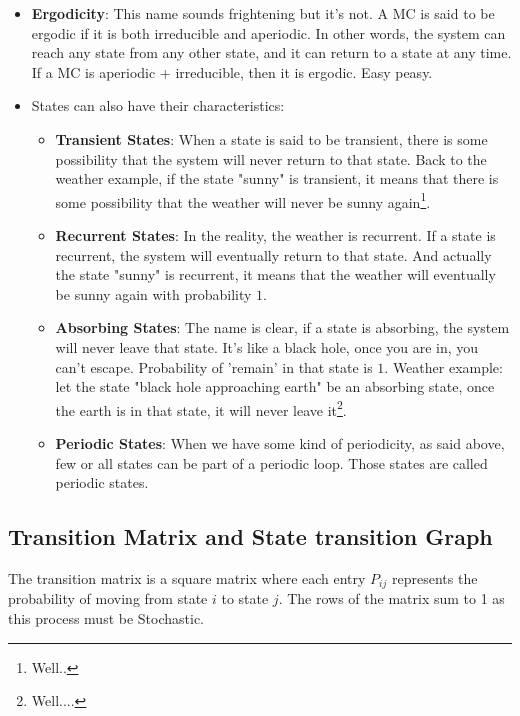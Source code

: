 \documentclass[a4paper]{article}
\begin{document}
\begin{itemize}
\begin{itemize}
        \item \textbf{Ergodicity}: This name sounds frightening but it's not. A MC is said to be ergodic if it is both irreducible and aperiodic. In other words, the system can reach any state from any other state, and it can return to a state at any time. If a MC is aperiodic + irreducible, then it is ergodic. Easy peasy.
        \item States can also have their characteristics: \begin{itemize}
            \item \textbf{Transient States}: When a state is said to be transient, there is some possibility that the system will never return to that state. Back to the weather example, if the state "sunny" is transient, it means that there is some possibility that the weather will never be sunny again\footnote{Well..}.
            \item \textbf{Recurrent States}: In the reality, the weather is recurrent. If a state is recurrent, the system will eventually return to that state. And actually the state "sunny" is recurrent, it means that the weather will eventually be sunny again with probability $1$.
            \item \textbf{Absorbing States}: The name is clear, if a state is absorbing, the system will never leave that state. It's like a black hole, once you are in, you can't escape. Probability of 'remain' in that state is $1$. Weather example: let the state "black hole approaching earth" be an absorbing state, once the earth is in that state, it will never leave it\footnote{Well....}.
            \item \textbf{Periodic States}: When we have some kind of periodicity, as said above, few or all states can be part of a periodic loop. Those states are called periodic states.
            \end{itemize}
        \end{itemize}
\end{itemize}

\subsection{Transition Matrix and State transition Graph}
The transition matrix is a square matrix where each entry $P_{ij}$ represents the probability of moving from state $i$ to state $j$. The rows of the matrix sum to 1 as this process must be Stochastic.
\end{document}
